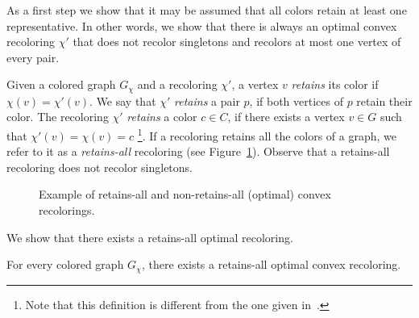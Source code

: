 As a first step we show that it may be assumed that all 
colors retain at least one representative.
%
In other words,
we show that there is always an optimal convex recoloring $\chi'$ 
that does not recolor singletons and recolors at most one vertex of every pair. 

Given a colored graph $G_\chi$ and a recoloring $\chi'$, 
a vertex $v$ \emph{retains} its color if $\chi(v)=\chi'(v)$. 
%
We say that $\chi'$ \emph{retains} a pair $p$, 
if both vertices of $p$ retain their color.  
%
The recoloring $\chi'$ \emph{retains} a color $c \in C$,
if there exists a vertex $v \in G$ such that ${\chi'(v) = \chi(v) = c}$
\footnote{
Note that this definition is different from the one given
in~\cite{kanj2009convex}.
}.
%
If a recoloring retains all the colors of a graph, 
we refer to it as a \emph{retains-all} recoloring (see Figure~\ref{fig:retains-all}).
Observe that a retains-all recoloring does not recolor singletons.

\begin{figure}
\centering
{}
\caption{
\label{fig:retains-all}
Example of retains-all and non-retains-all (optimal) convex recolorings.
}
\end{figure}
%
We show that there exists a retains-all optimal recoloring.

\begin{lemma}
\label{lm:retains-all}
For every colored graph $G_\chi$, 
there exists a retains-all optimal convex recoloring.
\end{lemma}


